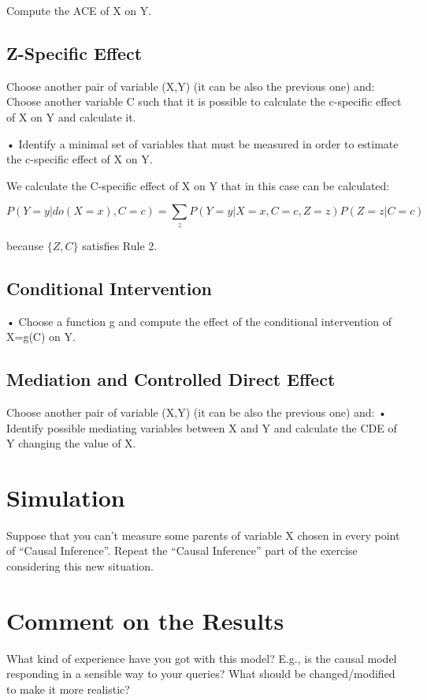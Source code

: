 \documentclass[a4paper,12pt]{article} %
\begin{document}
Compute the ACE of X on Y.

\subsection*{Z-Specific Effect}

Choose another pair of variable (X,Y) (it can be also the previous one) and:
Choose another variable C such that it is possible to calculate the c-specific effect of X on Y and calculate it.


• Identify a minimal set of variables that must be measured in order to estimate the c-specific effect of X on Y.



We calculate the C-specific effect of X on Y that in this case can be calculated:

$$P(Y=y|do(X=x), C=c)= \sum_{z} P(Y=y|X=x, C=c, Z=z) P(Z=z|C=c)$$

because $\{Z,C\}$ satisfies Rule 2.



\subsection*{Conditional Intervention}
• Choose a function g and compute the effect of the conditional intervention of X=g(C) on Y.

\subsection*{Mediation and Controlled Direct Effect}
Choose another pair of variable (X,Y) (it can be also the previous one) and:
• Identify possible mediating variables between X and Y and calculate the CDE of Y changing the value of X.

\section{Simulation}
Suppose that you can’t measure some parents of variable X chosen in every point of “Causal Inference”.
Repeat the “Causal Inference” part of the exercise considering this new situation.

\section{Comment on the Results}
What kind of experience have you got with this model? E.g., is the causal model responding in a sensible way to your queries? What should be changed/modified to make it more realistic?
\end{document}
